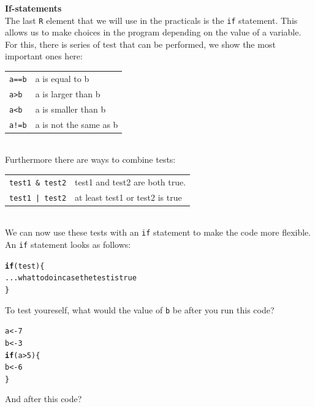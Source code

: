 \documentclass{article}\usepackage[]{graphicx}\usepackage[]{color}
\makeatletter
\newcommand{\hlnum}[1]{\textcolor[rgb]{0.686,0.059,0.569}{#1}}%
\newcommand{\hlopt}[1]{\textcolor[rgb]{0,0,0}{#1}}%
\newcommand{\hlstd}[1]{\textcolor[rgb]{0.345,0.345,0.345}{#1}}%
\newcommand{\hlkwa}[1]{\textcolor[rgb]{0.161,0.373,0.58}{\textbf{#1}}}%
\newcommand{\hlkwb}[1]{\textcolor[rgb]{0.69,0.353,0.396}{#1}}%
\newcommand{\hlkwd}[1]{\textcolor[rgb]{0.737,0.353,0.396}{\textbf{#1}}}%
\newenvironment{kframe}{%
 \def\at@end@of@kframe{}%
 \ifinner\ifhmode%
  \def\at@end@of@kframe{\end{minipage}}%
  \begin{minipage}{\columnwidth}%
 \fi\fi%
 \def\FrameCommand##1{\hskip\@totalleftmargin \hskip-\fboxsep
 \colorbox{shadecolor}{##1}\hskip-\fboxsep
     \hskip-\linewidth \hskip-\@totalleftmargin \hskip\columnwidth}%
 \MakeFramed {\advance\hsize-\width
   \@totalleftmargin\z@ \linewidth\hsize
   \@setminipage}}%
 {\par\unskip\endMakeFramed%
 \at@end@of@kframe}
\newenvironment{knitrout}{}{} %
\makeatother
\begin{document}
\begin{mdframed}
\textbf{If-statements}\\ The last \texttt{R} element that we will use in the practicals is the \texttt{if} statement. This allows us to make choices in the program depending on the value of a variable. For this, there is series of test that can be performed, we show the most important ones here:\\
\begin{tabular}{l l}
\texttt{a==b} & a is equal to b\\
\texttt{a>b} & a is larger than b\\
\texttt{a<b} & a is smaller than b\\
\texttt{a!=b} & a is not the same as b\\
\end{tabular}\\
Furthermore there are ways to combine tests:\\
\begin{tabular}{l l}
\texttt{test1 \& test2} & test1 and test2 are both true.\\
\texttt{test1 | test2} & at least test1 or test2 is true\\
\end{tabular}\\
We can now use these tests with an \texttt{if} statement to make the code more flexible. An \texttt{if} statement looks as follows:
\begin{knitrout}
\color{fgcolor}\begin{kframe}
\begin{alltt}
\hlkwd{if}(test)\{
  ... what to do in case the test is true
\}
\end{alltt}
\end{kframe}
\end{knitrout}
To test youreself, what would the value of \texttt{b} be after you run this code?
\begin{knitrout}
\color{fgcolor}\begin{kframe}
\begin{alltt}
\hlstd{a} \hlkwb{<-} \hlnum{7}
\hlstd{b} \hlkwb{<-} \hlnum{3}
\hlkwa{if}\hlstd{(a} \hlopt{>} \hlnum{5}\hlstd{)\{}
  \hlstd{b} \hlkwb{<-} \hlnum{6}
\hlstd{\}}
\end{alltt}
\end{kframe}
\end{knitrout}
And after this code?
\begin{knitrout}

\end{knitrout}
\end{mdframed}
\end{document}
